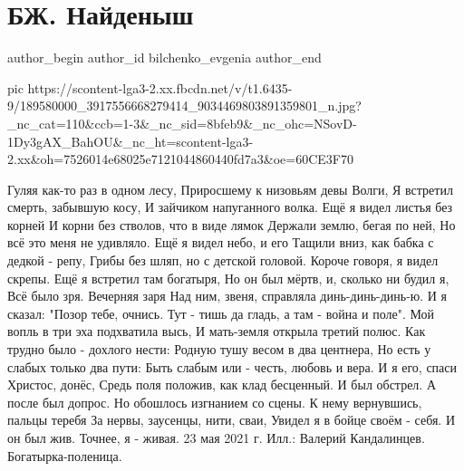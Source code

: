  
 
 
 
 
 
\section{БЖ. Найденыш}
\label{sec:23_05_2021.fb.bilchenko_evgenia.1.najdenysh}
\ifcmt
 author_begin
   author_id bilchenko_evgenia
 author_end
\fi


\ifcmt
  pic https://scontent-lga3-2.xx.fbcdn.net/v/t1.6435-9/189580000_3917556668279414_9034469803891359801_n.jpg?_nc_cat=110&ccb=1-3&_nc_sid=8bfeb9&_nc_ohc=NSovD-1Dy3gAX_BahOU&_nc_ht=scontent-lga3-2.xx&oh=7526014e68025e7121044860440fd7a3&oe=60CE3F70
\fi


Гуляя как-то раз в одном лесу,
Приросшему к низовьям девы Волги,
Я встретил смерть, забывшую косу,
И зайчиком напуганного волка.
Ещё я видел листья без корней
И корни без стволов, что в виде лямок
Держали землю, бегая по ней,
Но всё это меня не удивляло.
Ещё я видел небо, и его
Тащили вниз, как бабка с дедкой - репу,
Грибы без шляп, но с детской головой.
Короче говоря, я видел скрепы.
Ещё я встретил там богатыря,
Но он был мёртв, и, сколько ни будил я,
Всё было зря. Вечерняя заря
Над ним, звеня, справляла динь-динь-динь-ю.
И я сказал: "Позор тебе, очнись.
Тут - тишь да гладь, а там - война и поле".
Мой вопль в три эха подхватила высь,
И мать-земля открыла третий полюс.
Как трудно было - дохлого нести:
Родную тушу весом в два центнера,
Но есть у слабых только два пути:
Быть слабым или - честь, любовь и вера.
И я его, спаси Христос, донёс,
Средь поля положив, как клад бесценный.
И был обстрел. А после был допрос.
Но обошлось изгнанием со сцены.
К нему вернувшись, пальцы теребя
За нервы, заусенцы, нити, сваи,
Увидел я в бойце своём - себя.
И он был жив.
Точнее, я - живая.
23 мая 2021 г.
Илл.: Валерий Кандалинцев. Богатырка-поленица.

